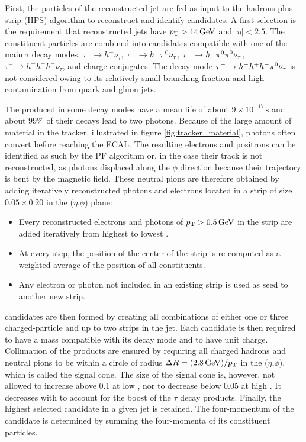 First, the particles of the reconstructed jet are fed as input to the hadrons-plus-strip (HPS) algorithm \cite{tauh_reconstruction} to reconstruct and identify \tauh candidates. A first selection is the requirement that reconstructed jets have $p_{\mathrm{T}} > 14\,\mathrm{GeV}$ and $|\eta| < 2.5$.
The constituent particles are combined into \tauh candidates compatible with one of the main $\tau$ decay modes, $\tau^- \rightarrow h^- \nu_\tau$, $\tau^- \rightarrow h^- \pi^{0} \nu_\tau$, $\tau^- \rightarrow h^- \pi^{0} \pi^{0} \nu_\tau$, $\tau^- \rightarrow h^- h^+ h^- \nu_\tau$, and charge conjugates. The decay mode $\tau^- \rightarrow h^- h^+ h^- \pi^{0} \nu_\tau$ is not considered owing to its relatively small branching fraction and high contamination from quark and gluon jets.

The \pizero produced in some decay modes have a mean life of about $9 \times 10^{-17}\,\mathrm{s}$ and about $99\%$ of their decays lead to two photons. Because of the large amount of material in the tracker, illustrated in figure \ref{fig:tracker_material}, photons often convert before reaching the ECAL. The resulting electrons and positrons can be identified as such by the PF algorithm or, in the case their track is not reconstructed, as photons displaced along the $\phi$ direction because their trajectory is bent by the magnetic field.
These neutral pions are therefore obtained by adding iteratively reconstructed photons and electrons located in a strip of size $0.05 \times 0.20$ in the ($\eta$,$\phi$) plane:
\begin{itemize}
    \item Every reconstructed electrons and photons of $p_{\mathrm{T}} > 0.5\,\mathrm{GeV}$ in the strip are added iteratively from highest to lowest \pt.
    \item At every step, the position of the center of the strip is re-computed as a \pt-weighted average of the position of all constituents.
    \item Any electron or photon not included in an existing strip is used as seed to another new strip.
\end{itemize}

\tauh candidates are then formed by creating all combinations of either one or three charged-particle and up to two strips in the jet.
Each \tauh candidate is then required to have a mass compatible with its decay mode and to have unit charge.
Collimation of the products are ensured by requiring all charged hadrons and neutral pions to be within a circle of radius $\Delta R = (2.8\,\mathrm{GeV})/p_{\mathrm{T}}$ in the ($\eta$,$\phi$), which is called the signal cone.
The size of the signal cone is, however, not allowed to increase above 0.1 at low \pt, nor to decrease below 0.05 at high \pt. It decreases with \pt to account for the boost of the $\tau$ decay products. Finally, the highest \pt selected \tauh candidate in a given jet is retained. The four-momentum of the \tauh candidate is determined by summing the four-momenta of its constituent particles.

